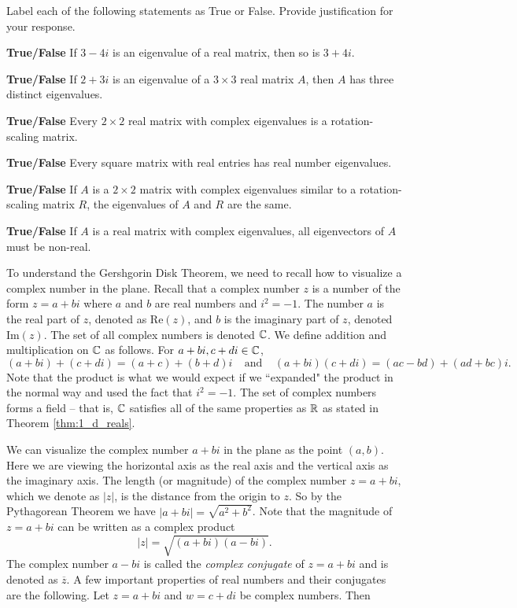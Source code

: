 \ea


\item Label each of the following statements as True or False. Provide justification for your response.
\ba
\item \textbf{True/False} If $3-4i$ is an eigenvalue of a real matrix, then so is $3+4i$.

\item \textbf{True/False} If $2+3i$ is an eigenvalue of a $3\times 3$ real matrix $A$, then $A$ has three distinct eigenvalues.

\item \textbf{True/False} Every $2\times 2$ real matrix with complex eigenvalues is a rotation-scaling matrix.

\item \textbf{True/False} Every square matrix with real entries has real number eigenvalues. 

\item \textbf{True/False} If $A$ is a $2\times 2$ matrix with complex eigenvalues similar to a rotation-scaling matrix $R$, the eigenvalues of $A$ and $R$ are the same.

\item \textbf{True/False} If $A$ is a real matrix with complex eigenvalues, all eigenvectors of $A$ must be non-real.


\ea

\ee


To understand the Gershgorin Disk Theorem, we need to recall how to visualize a complex number in the plane. Recall that a complex number $z$ is a number of the form $z = a+bi$ where $a$ and $b$ are real numbers and $i^2 = -1$. The number $a$ is the real part of $z$, denoted as $\text{Re}(z)$, and $b$ is the imaginary part of $z$, denoted $\text{Im}(z)$. The set of all complex numbers is denoted $\mathbb{C}$. We define addition and multiplication on $\mathbb{C}$ as follows. For $a+bi, c+di \in \mathbb{C}$, 
\[(a+bi) + (c+di) = (a+c) + (b+d)i \ \ \ \ \ \text{and} \ \ \ \ \ (a+bi)(c+di) = (ac-bd) + (ad+bc)i.\]
Note that the product is what we would expect if we ``expanded" the product in the normal way and used the fact that $i^2=-1$. The set of complex numbers forms a field -- that is, $\mathbb{C}$ satisfies all of the same properties as $\mathbb{R}$ as stated in Theorem \ref{thm:1_d_reals}. 

We can visualize the complex number $a+bi$ in the plane as the point $(a,b)$. Here we are viewing the horizontal axis as the real axis and the vertical axis as the imaginary axis. The length (or magnitude) of the complex number $z = a+bi$, which we denote as $|z|$, is the distance from the origin to $z$. So by the Pythagorean Theorem we have $|a+bi| = \sqrt{a^2+b^2}$. Note that the magnitude of $z = a+bi$ can be written as a complex product 
\[|z| = \sqrt{(a+bi)(a-bi)}.\]
The complex number $a-bi$ is called the \emph{complex conjugate} of $z=a+bi$ and is denoted as $\overline{z}$. A few important properties of real numbers and their conjugates are the following. Let $z = a+bi$ and $w = c+di$ be complex numbers. Then

